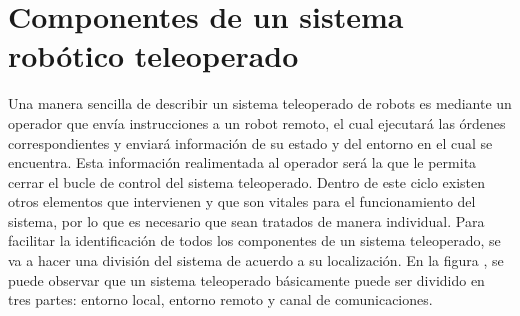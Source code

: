 







\section{Componentes de un sistema robótico teleoperado}


Una manera sencilla de describir un sistema teleoperado de robots es mediante un operador que envía instrucciones a un robot remoto, el cual ejecutará las órdenes correspondientes y enviará información de su estado y del entorno en el cual se encuentra. Esta información realimentada al operador será la que le permita cerrar el bucle de control del sistema teleoperado. Dentro de este ciclo existen otros elementos que intervienen y que son vitales para el funcionamiento del sistema, por lo que es necesario que sean tratados de manera individual. Para facilitar la identificación de todos los componentes de un sistema teleoperado, se va a hacer una división del sistema de acuerdo a su localización. En la figura , se puede observar que un sistema teleoperado básicamente puede ser dividido en tres partes: entorno local, entorno remoto y canal de comunicaciones.\\


